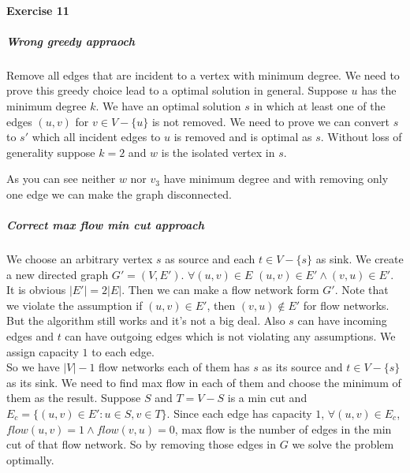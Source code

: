 \documentclass{book}
\begin{document}
	\paragraph{Exercise 11}
	\label{sec:MaxFlowEdgeConnectivity}
	\subparagraph{Wrong greedy appraoch} Remove all edges that are incident to a vertex with minimum degree. We need to prove this greedy choice lead to a optimal solution in general. Suppose $u$ has the minimum degree $k$. We have an optimal solution $s$ in which at least one of the edges $(u, v)$ for $v \in V - \{u\}$ is not removed. We need to prove we can convert $s$ to $s'$ which all incident edges to $u$ is removed and is optimal as $s$. Without loss of generality suppose $k = 2$ and $w$ is the isolated vertex in $s$.
	\begin{figure}[h!]
		\centering
	\end{figure}
	As you can see neither $w$ nor $v_3$ have minimum degree and with removing only one edge we can make the graph disconnected.
	\FloatBarrier
	\subparagraph{Correct max flow min cut approach} We choose an arbitrary vertex $s$ as source and each $t \in V - \{s\}$ as sink. We create a new directed graph $G' = (V, E')$. $\forall (u, v) \in E$ $(u, v) \in E' \land (v, u) \in E'$. It is obvious $|E'| = 2|E|$. Then we can make a flow network form $G'$. Note that we violate the assumption if $(u, v) \in E'$, then $(v, u) \not\in E'$ for flow networks. But the algorithm still works and it's not a big deal. Also $s$ can have incoming edges and $t$ can have outgoing edges which is not violating any assumptions. We assign capacity $1$ to each edge.\\
	So we have $|V| - 1$ flow networks each of them has $s$ as its source and $t \in V - \{s\}$ as its sink. We need to find max flow in each of them and choose the minimum of them as the result. Suppose $S$ and $T = V - S$ is a min cut and $E_c = \{(u, v) \in E' : u \in S, v \in T\}$. Since each edge has capacity $1$, $\forall (u, v) \in E_c$, $flow(u, v) = 1 \land flow(v, u) = 0$, max flow is the number of edges in the min cut of that flow network. So by removing those edges in $G$ we solve the problem optimally. \\
\end{document}
